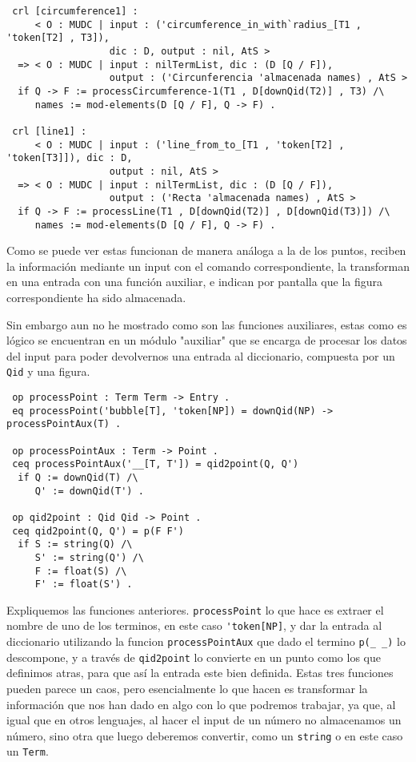 {\codesize
\begin{verbatim}
 crl [circumference1] :
     < O : MUDC | input : ('circumference_in_with`radius_[T1 , 'token[T2] , T3]),
                  dic : D, output : nil, AtS >
  => < O : MUDC | input : nilTermList, dic : (D [Q / F]),
                  output : ('Circunferencia 'almacenada names) , AtS >
  if Q -> F := processCircumference-1(T1 , D[downQid(T2)] , T3) /\
     names := mod-elements(D [Q / F], Q -> F) .

 crl [line1] :
     < O : MUDC | input : ('line_from_to_[T1 , 'token[T2] , 'token[T3]]), dic : D,
                  output : nil, AtS >
  => < O : MUDC | input : nilTermList, dic : (D [Q / F]),
                  output : ('Recta 'almacenada names) , AtS >
  if Q -> F := processLine(T1 , D[downQid(T2)] , D[downQid(T3)]) /\
     names := mod-elements(D [Q / F], Q -> F) .
\end{verbatim}
}

Como se puede ver estas funcionan de manera análoga a la de los puntos, reciben la información mediante un input con el comando correspondiente, la transforman en una entrada con una función auxiliar, e indican por pantalla que la figura correspondiente ha sido almacenada. \par

Sin embargo aun no he mostrado como son las funciones auxiliares, estas como es lógico se encuentran en un módulo "auxiliar" que se encarga de procesar los datos del input para poder devolvernos una entrada al diccionario, compuesta por un \texttt{Qid} y una figura.\par

{\codesize
\begin{verbatim}
 op processPoint : Term Term -> Entry .
 eq processPoint('bubble[T], 'token[NP]) = downQid(NP) -> processPointAux(T) .

 op processPointAux : Term -> Point .
 ceq processPointAux('__[T, T']) = qid2point(Q, Q')
  if Q := downQid(T) /\
     Q' := downQid(T') .

 op qid2point : Qid Qid -> Point .
 ceq qid2point(Q, Q') = p(F F')
  if S := string(Q) /\
     S' := string(Q') /\
     F := float(S) /\
     F' := float(S') .
\end{verbatim}
}

Expliquemos las funciones anteriores. \texttt{processPoint} lo que hace es extraer el nombre de uno de los terminos, en este caso \verb"'token[NP]", y dar la entrada al diccionario utilizando la funcion \texttt{processPointAux} que dado el termino \verb"p(_ _)" lo descompone, y a través de \texttt{qid2point} lo convierte en un punto como los que definimos atras, para que así la entrada este bien definida. Estas tres funciones pueden parece un caos, pero esencialmente lo que hacen es transformar la información que nos han dado en algo con lo que podremos trabajar, ya que, al igual que en otros lenguajes, al hacer el input de un número no almacenamos un número, sino otra que luego deberemos convertir, como un \verb"string" o en este caso un \verb"Term". \par

